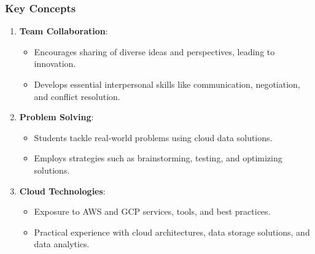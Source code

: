 \documentclass[aspectratio=169]{beamer}
\begin{document}
\begin{frame}[fragile]
    \frametitle{Key Concepts}
    \begin{enumerate}
        \item \textbf{Team Collaboration}:
        \begin{itemize}
            \item Encourages sharing of diverse ideas and perspectives, leading to innovation.
            \item Develops essential interpersonal skills like communication, negotiation, and conflict resolution.
        \end{itemize}
        
        \item \textbf{Problem Solving}:
        \begin{itemize}
            \item Students tackle real-world problems using cloud data solutions.
            \item Employs strategies such as brainstorming, testing, and optimizing solutions.
        \end{itemize}
        
        \item \textbf{Cloud Technologies}:
        \begin{itemize}
            \item Exposure to AWS and GCP services, tools, and best practices.
            \item Practical experience with cloud architectures, data storage solutions, and data analytics.
        \end{itemize}
    \end{enumerate}
\end{frame}
\end{document}
